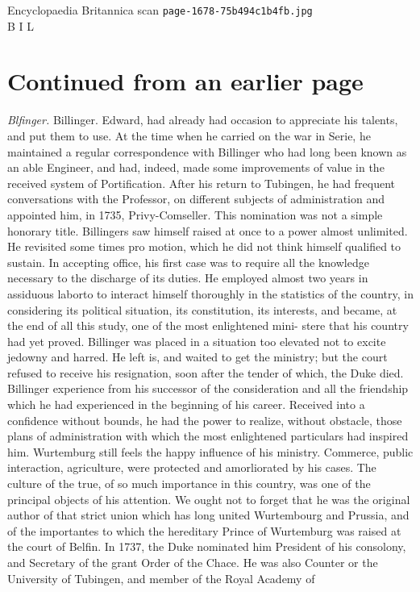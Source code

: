 \documentclass{article}
\begin{document}
\begin{center}
{\Large Encyclopaedia Britannica scan \texttt{page-1678-75b494c1b4fb.jpg}}\\[0.5em]
B I L
\end{center}
\section*{Continued from an earlier page}
\textit{Blfinger.}
Billinger. Edward, had already had occasion to appreciate his talents, and put them to use. At the time when he carried on the war in Serie, he maintained a regular correspondence with Billinger who had long been known as an able Engineer, and had, indeed, made some improvements of value in the received system of Portification. After his return to Tubingen, he had frequent conversations with the Professor, on different subjects of administration and appointed him, in 1735, Privy-Comseller. This nomination was not a simple honorary title. Billingers saw himself raised at once to a power almost unlimited. He revisited some times pro motion, which he did not think himself qualified to sustain. In accepting office, his first case was to require all the knowledge necessary to the discharge of its duties. He employed almost two years in assiduous laborto to interact himself thoroughly in the statistics of the country, in considering its political situation, its constitution, its interests, and became, at the end of all this study, one of the most enlightened mini- stere that his country had yet proved. Billinger was placed in a situation too elevated not to excite jedowny and harred. He left is, and waited to get the ministry; but the court refused to receive his resignation, soon after the tender of which, the Duke died. Billinger experience from his successor of the consideration and all the friendship which he had experienced in the beginning of his career. Received into a confidence without bounds, he had the power to realize, without obstacle, those plans of administration with which the most enlightened particulars had inspired him. Wurtemburg still feels the happy influence of his ministry. Commerce, public interaction, agriculture, were protected and amorliorated by his cases. The culture of the true, of so much importance in this country, was one of the principal objects of his attention. We ought not to forget that he was the original author of that strict union which has long united Wurtembourg and Prussia, and of the importantes to which the hereditary Prince of Wurtemburg was raised at the court of Belfin. In 1737, the Duke nominated him President of his consolony, and Secretary of the grant Order of the Chace. He was also Counter or the University of Tubingen, and member of the Royal Academy of
\end{document}
